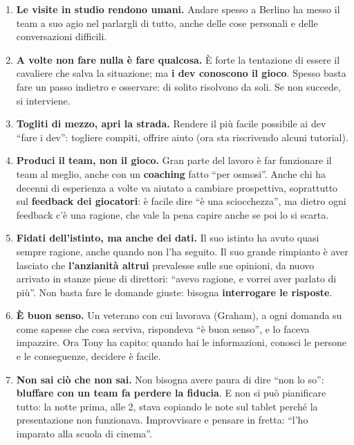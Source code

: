 \begin{enumerate}
  \item \textbf{Le visite in studio rendono umani.} Andare spesso a Berlino ha
        messo il team a suo agio nel parlargli di tutto, anche delle cose personali
        e delle conversazioni difficili.
  \item \textbf{A volte non fare nulla è fare qualcosa.} È forte la tentazione di
        essere il cavaliere che salva la situazione; ma \textbf{i dev conoscono il
        gioco}. Spesso basta fare un passo indietro e osservare: di solito risolvono
        da soli. Se non succede, si interviene.
  \item \textbf{Togliti di mezzo, apri la strada.} Rendere il più facile possibile
        ai dev ``fare i dev'': togliere compiti, offrire aiuto (ora sta riscrivendo
        alcuni tutorial).
  \item \textbf{Produci il team, non il gioco.} Gran parte del lavoro è far
        funzionare il team al meglio, anche con un \textbf{coaching} fatto ``per
        osmosi''. Anche chi ha decenni di esperienza a volte va aiutato a cambiare
        prospettiva, soprattutto sul \textbf{feedback dei giocatori}: è facile dire
        ``è una sciocchezza'', ma dietro ogni feedback c'è una ragione, che vale la
        pena capire anche se poi lo si scarta.
  \item \textbf{Fidati dell'istinto, ma anche dei dati.} Il suo istinto ha avuto
        quasi sempre ragione, anche quando non l'ha seguito. Il suo grande
        rimpianto è aver lasciato che \textbf{l'anzianità altrui} prevalesse sulle
        sue opinioni, da nuovo arrivato in stanze piene di direttori: ``avevo
        ragione, e vorrei aver parlato di più''. Non basta fare le domande giuste:
        bisogna \textbf{interrogare le risposte}.
  \item \textbf{È buon senso.} Un veterano con cui lavorava (Graham), a ogni
        domanda su come sapesse che cosa serviva, rispondeva ``è buon senso'', e
        lo faceva impazzire. Ora Tony ha capito: quando hai le informazioni, conosci
        le persone e le conseguenze, decidere è facile.
  \item \textbf{Non sai ciò che non sai.} Non bisogna avere paura di dire ``non lo
        so'': \textbf{bluffare con un team fa perdere la fiducia}. E non si può
        pianificare tutto: la notte prima, alle 2, stava copiando le note sul tablet
        perché la presentazione non funzionava. Improvvisare e pensare in fretta:
        ``l'ho imparato alla scuola di cinema''.
\end{enumerate}

